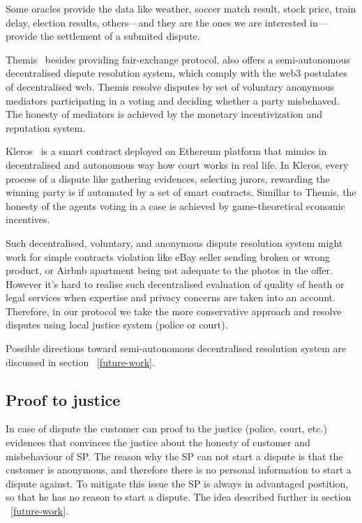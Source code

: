 \documentclass{ieeeaccess}
\begin{document}
Some oracles provide the data like weather, soccer match result, stock
price, train delay, election results, others---and they are the ones we
are interested in---provide the settlement of a submited dispute.


Themis~\cite{meng2019themis} besides providing fair-exchange protocol,
also offers a semi-autonomous decentralised dispute resolution system,
which comply with the web3 postulates of decentralised web. Themis
resolve disputes by set of voluntary anonymous mediators participating
in a voting and deciding whether a party misbehaved. The honesty of
mediators is achieved by the monetary incentivization and reputation
system.

Kleros~\cite{lesaege2018kleros} is a smart contract deployed on
Ethereum platform that mimics in decentralised and autonomous way how
court works in real life. In Kleros, every process of a dispute like
gathering evidences, selecting jurors, rewarding the winning party is if
automated by a set of smart contracts. Simillar to Themis, the honesty
of the agents voting in a case is achieved by game-theoretical economic
incentives.

Such decentralised, voluntary, and anonymous dispute resolution system
might work for simple contracts violation like eBay seller sending
broken or wrong product, or Airbnb apartment being not adequate to the
photos in the offer. However it's hard to realise such decentralised
evaluation of quality of heath or legal services when expertise and
privacy concerns are taken into an account. Therefore, in our protocol
we take the more conservative approach and resolve disputes using local
justice system (police or court).

Possible directions toward semi-autonomous decentralised resolution
system are discussed in section ~\ref{future-work}.


\subsection{Proof to justice}\label{proof-of-justice}
In case of dispute the customer can proof to the justice (police, court,
etc.) evidences that convinces the justice about the honesty of customer
and misbehaviour of SP. The reason why the SP can not start a dispute is
that the customer is anonymous, and therefore there is no personal
information to start a dispute against. To mitigate this issue the SP is
always in advantaged postition, so that he has no reason to start a
dispute. The idea described further in section ~\ref{future-work}.
\end{document}
